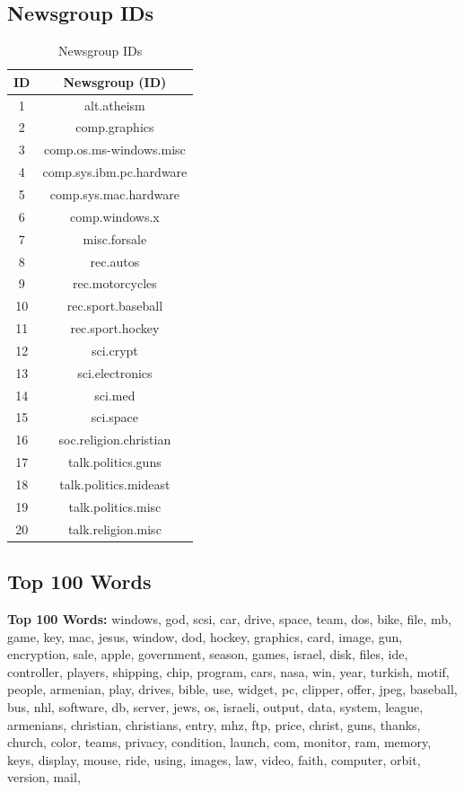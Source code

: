 \documentclass{IEEEtran}
\begin{document}
\subsection{Newsgroup IDs}

\begin{table}[ht]
  \caption{Newsgroup IDs}
  \centering
  \begin{tabular}{c c }
  \hline\hline
  ID & Newsgroup (ID) \\ [0.5ex]
  \hline
   1 & alt.atheism \\
   2 & comp.graphics \\
   3 & comp.os.ms-windows.misc \\
   4 & comp.sys.ibm.pc.hardware \\
   5 & comp.sys.mac.hardware \\
   6 & comp.windows.x \\
   7 & misc.forsale \\
   8 & rec.autos \\
   9 & rec.motorcycles \\
  10 & rec.sport.baseball \\
  11 & rec.sport.hockey \\
  12 & sci.crypt \\
  13 & sci.electronics \\
  14 & sci.med \\
  15 & sci.space \\
  16 & soc.religion.christian \\
  17 & talk.politics.guns \\
  18 & talk.politics.mideast \\
  19 & talk.politics.misc \\
  20 & talk.religion.misc \\

  \hline
  \end{tabular}
  \label{table:newsgroupids}
\end{table}



\twocolumn
\subsection{Top 100 Words}
\textbf{Top 100 Words:}
  windows,
  god,
  scsi,
  car,
  drive,
  space,
  team,
  dos,
  bike,
  file,
  mb,
  game,
  key,
  mac,
  jesus,
  window,
  dod,
  hockey,
  graphics,
  card,
  image,
  gun,
  encryption,
  sale,
  apple,
  government,
  season,
  games,
  israel,
  disk,
  files,
  ide,
  controller,
  players,
  shipping,
  chip,
  program,
  cars,
  nasa,
  win,
  year,
  turkish,
  motif,
  people,
  armenian,
  play,
  drives,
  bible,
  use,
  widget,
  pc,
  clipper,
  offer,
  jpeg,
  baseball,
  bus,
  nhl,
  software,
  db,
  server,
  jews,
  os,
  israeli,
  output,
  data,
  system,
  league,
  armenians,
  christian,
  christians,
  entry,
  mhz,
  ftp,
  price,
  christ,
  guns,
  thanks,
  church,
  color,
  teams,
  privacy,
  condition,
  launch,
  com,
  monitor,
  ram,
  memory,
  keys,
  display,
  mouse,
  ride,
  using,
  images,
  law,
  video,
  faith,
  computer,
  orbit,
  version,
  mail,
\end{document}
